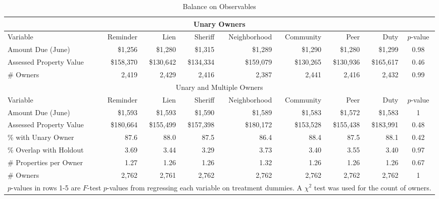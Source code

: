 \begin{appendices}
\begin{sidewaystable}[htbp]
\centering
\caption{Balance on Observables}
\label{balance2}
\begin{tabular}{lrrrrrrrc}
\hline
\multicolumn{9}{c}{Unary Owners} \\
  \hline
Variable & Reminder & Lien & Sheriff & Neighborhood & Community & Peer & Duty & $p$-value \\ 
   \hline
Amount Due (June) & \$1,256 & \$1,280 & \$1,315 & \$1,289 & \$1,290 & \$1,280 & \$1,299 & 0.98 \\ 
  Assessed Property Value & \$158,370 & \$130,642 & \$134,334 & \$159,079 & \$130,265 & \$130,936 & \$165,617 & 0.46 \\ 
  \# Owners & 2,419 & 2,429 & 2,416 & 2,387 & 2,441 & 2,416 & 2,432 & 0.99 \\ 
  \hline
\multicolumn{9}{c}{Unary and Multiple Owners} \\
  \hline
Variable & Reminder & Lien & Sheriff & Neighborhood & Community & Peer & Duty & $p$-value \\ 
   \hline
Amount Due (June) & \$1,593 & \$1,593 & \$1,590 & \$1,589 & \$1,583 & \$1,572 & \$1,583 & 1 \\ 
  Assessed Property Value & \$180,664 & \$155,499 & \$157,398 & \$180,172 & \$153,528 & \$155,438 & \$183,991 & 0.48 \\ 
  \% with Unary Owner & 87.6 & 88.0 & 87.5 & 86.4 & 88.4 & 87.5 & 88.1 & 0.42 \\ 
  \% Overlap with Holdout & 3.69 & 3.44 & 3.29 & 3.73 & 3.40 & 3.55 & 3.40 & 0.97 \\ 
  \# Properties per Owner & 1.27 & 1.26 & 1.26 & 1.32 & 1.26 & 1.26 & 1.26 & 0.67 \\ 
  \# Owners & 2,762 & 2,761 & 2,762 & 2,762 & 2,762 & 2,762 & 2,762 & 1 \\ 
  \hline
\multicolumn{9}{l}{\scriptsize{$p$-values in rows 1-5 are $F$-test $p$-values from regressing each variable on treatment dummies. A $\chi^2$ test was used for the count of owners.}} \\
\end{tabular}
\end{sidewaystable}



\end{appendices}
